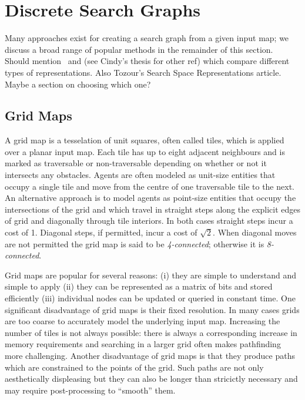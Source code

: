 \section{Discrete Search Graphs}
\label{cha::lit::graphs}
Many approaches exist for creating a search graph from a given input map; we
discuss a broad range of popular methods in the remainder of this section.
\\ \newline
Should mention~\citep{yap02} and (see Cindy's thesis for other ref) which 
compare different types of representations. Also Tozour's Search Space Representations
article.
Maybe a section on choosing which one?

\subsection{Grid Maps}
\label{cha::lit::graphs::grid}
A grid map is a tesselation of unit squares, often called tiles, which is
applied over a planar input map. Each tile has up to eight adjacent neighbours
and is marked as traversable or non-traversable depending on whether or not it
intersects any obstacles.  Agents are often modeled as unit-size entities that
occupy a single tile and move from the centre of one traversable tile to the
next.  
An alternative approach is to model agents as point-size entities that occupy 
the intersections of the grid and which travel in straight steps along the
explicit edges of grid and diagonally through tile interiors.
In both cases straight steps incur a cost of 1. Diagonal steps, if permitted, 
incur a cost of $\sqrt{2}$.  When diagonal moves are not permitted the grid map 
is said to be \emph{4-connected}; otherwise it is \emph{8-connected}.  

Grid maps are popular for several reasons: (i) they are simple to understand 
and simple to apply (ii) they can be represented as a matrix of bits and stored
efficiently (iii) individual nodes can be updated or queried in constant time.
One significant disadvantage of grid maps is their fixed resolution. In many cases 
grids are too coarse to accurately model the underlying input map. Increasing the
number of tiles is not always possible: there is always a corresponding increase in
memory requirements and searching in a larger grid often makes pathfinding more 
challenging.
Another disadvantage of grid maps is that they produce paths which are
constrained to the points of the grid. Such paths are not only aesthetically
displeasing but they can also be longer than stricictly necessary and may
require post-processing to ``smooth'' them.

